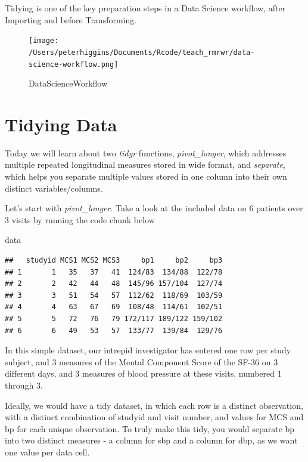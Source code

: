 \documentclass[
]{book}
\newenvironment{Shaded}{\begin{snugshade}}{\end{snugshade}}
\newcommand{\NormalTok}[1]{#1}
\begin{document}
Tidying is one of the key preparation steps in a Data Science workflow, after Importing and before Transforming.

\begin{figure}
\centering
\texttt{[image: /Users/peterhiggins/Documents/Rcode/teach\_rmrwr/data-science-workflow.png]}
\caption{DataScienceWorkflow}
\end{figure}

\hypertarget{tidying-data}{%
\section{Tidying Data}\label{tidying-data}}

Today we will learn about two \emph{tidyr} functions,
\emph{pivot\_longer}, which addresses multiple repeated longitudinal measures stored in wide format, and
\emph{separate}, which helps you separate multiple values stored in one column into their own distinct variables/columns.

Let's start with \emph{pivot\_longer}. Take a look at the included data on 6 patients over 3 visits by running the code chunk below

\begin{Shaded}
\begin{Highlighting}[]
\NormalTok{data}
\end{Highlighting}
\end{Shaded}

\begin{verbatim}
##   studyid MCS1 MCS2 MCS3     bp1     bp2     bp3
## 1       1   35   37   41  124/83  134/88  122/78
## 2       2   42   44   48  145/96 157/104  127/74
## 3       3   51   54   57  112/62  118/69  103/59
## 4       4   63   67   69  108/48  114/61  102/51
## 5       5   72   76   79 172/117 189/122 159/102
## 6       6   49   53   57  133/77  139/84  129/76
\end{verbatim}

In this simple dataset, our intrepid investigator has entered one row per study subject, and 3 measures of the Mental Component Score of the SF-36 on 3 different days, and 3 measures of blood pressure at these visits, numbered 1 through 3.

Ideally, we would have a tidy dataset, in which each row is a distinct observation, with a distinct combination of studyid and visit number, and values for MCS and bp for each unique observation. To truly make this tidy, you would separate bp into two distinct measures - a column for sbp and a column for dbp, as we want one value per data cell.
\end{document}
